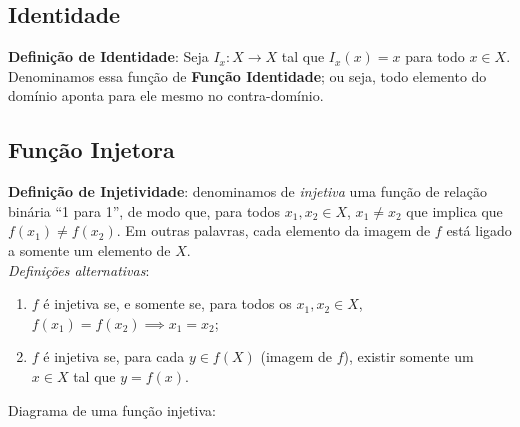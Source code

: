 \documentclass[13pt,letterpaper]{article}
\begin{document}
\subsection{Identidade}
\textbf{Definição de Identidade}: Seja $I_x : X \rightarrow X$ tal que $I_x(x) = x$ para todo $x \in X$. Denominamos essa função de \textbf{Função Identidade}; ou seja, todo elemento do domínio aponta para ele mesmo no contra-domínio.

\subsection{Função Injetora}
\textbf{Definição de Injetividade}: denominamos de \emph{injetiva} uma função de relação binária \enquote{1 para 1}, de modo que, para todos $x_1, x_2 \in X$, $x_1 \ne x_2$ que implica que $f(x_1) \ne f(x_2)$. Em outras palavras, cada elemento da imagem de $f$ está ligado a somente um elemento de $X$. \\
\emph{Definições alternativas}: 
\begin{enumerate}
    \item $f$ é injetiva se, e somente se, para todos os $x_1, x_2 \in X$, $f(x_1) = f(x_2) \implies x_1 = x_2$;
    \item $f$ é injetiva se, para cada $y \in f(X)$ (imagem de $f$), existir somente um $x \in X$ tal que $y = f(x)$.
\end{enumerate}
Diagrama de uma função injetiva:
\begin{center}
\end{center}
\end{document}
